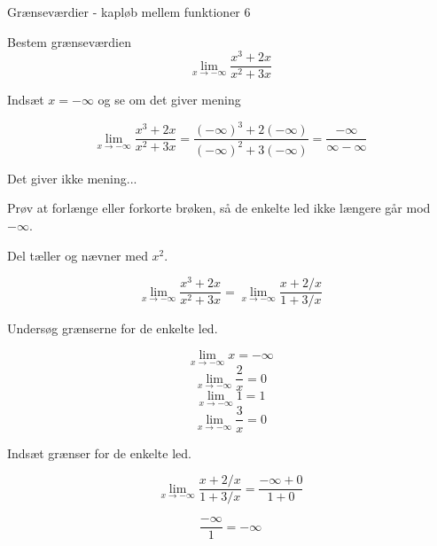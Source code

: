 \documentclass{article}
\begin{document}
\begin{exercise}{Grænseværdier - kapløb mellem funktioner 6}

Bestem grænseværdien
\[
\lim_{x \to - \infty} \frac{x^3 + 2x}{x^2 + 3x}
\]


\hint
Indsæt $x= - \infty$ og se om det giver mening

\hint
\[
\lim_{x \to - \infty} \frac{x^3 + 2x}{x^2 + 3x} = \frac{(- \infty)^3 + 2(- \infty)}{(- \infty)^2 + 3(- \infty)} = \frac{ - \infty}{\infty - \infty}
\]

\hint
Det giver ikke mening...

\hint
Prøv at forlænge eller forkorte brøken, så de enkelte led ikke længere går mod $ - \infty$.

\hint
Del tæller og nævner med $x^2$.

\hint
\[
\lim_{x \to - \infty} \frac{x^3 + 2x}{x^2 + 3x} = \lim_{x \to - \infty} \frac{x + 2/x}{1 + 3/x}
\]

\hint
Undersøg grænserne for de enkelte led.

\hint
\[
\lim_{x \to - \infty} x = - \infty
\]
\[
\lim_{x \to - \infty} \frac{2}{x} = 0
\]
\[
\lim_{x \to - \infty} 1= 1
\]
\[
\lim_{x \to - \infty} \frac{3}{x} = 0
\]

\hint
Indsæt grænser for de enkelte led.

\hint
\[
\lim_{x \to - \infty} \frac{x + 2/x}{1 + 3/x} = \frac{ - \infty + 0}{1 + 0 }
\]

\hint
\[
\frac{ - \infty}{1 } = - \infty
\]

\end{exercise}
\newpage
\end{document}
